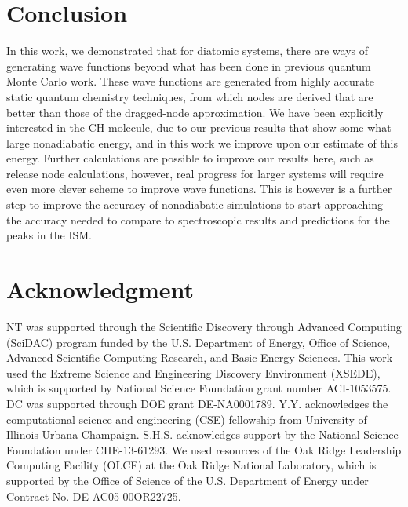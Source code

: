 \documentclass[aip,jcp,numerical,reprint]{revtex4-1}
\begin{document}

\section{Conclusion}

In this work, we demonstrated that for diatomic systems, there are ways of generating wave functions beyond what has been done in previous quantum Monte Carlo work.  These wave functions are generated from highly accurate static quantum chemistry techniques, from which nodes are derived that are better than those of the dragged-node approximation.  We have been explicitly interested in the CH molecule, due to our previous results that show some what large nonadiabatic energy, and in this work we improve upon our estimate of this energy.  Further calculations are possible to improve our results here, such as release node calculations, however, real progress for larger systems will require even more clever scheme to improve wave functions.   This is however is a further step to improve the accuracy of nonadiabatic simulations to start approaching the accuracy needed to compare to spectroscopic results and predictions for the peaks in the ISM.


\section{Acknowledgment}
NT was supported through the Scientific Discovery through Advanced Computing (SciDAC) program funded by the U.S. Department of Energy, Office of Science, Advanced Scientific Computing
Research, and Basic Energy Sciences.  This work used the Extreme Science and Engineering Discovery Environment (XSEDE), which is supported by National Science Foundation grant number ACI-1053575.   DC was supported through  DOE grant DE-NA0001789. Y.Y. acknowledges the computational science and engineering (CSE) fellowship from University of Illinois Urbana-Champaign. S.H.S. acknowledges support by the National Science Foundation under CHE-13-61293. We used resources of the Oak Ridge Leadership Computing Facility (OLCF) at the Oak Ridge National Laboratory, which is supported by the Office of Science of the U.S. Department of Energy under Contract No. DE-AC05-00OR22725.


\end{document}
